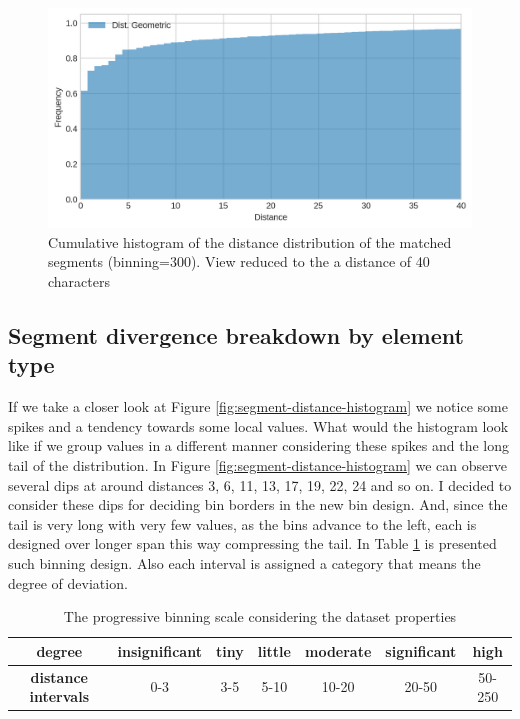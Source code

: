    \begin{figure}[!ht]
        \centering
        \includegraphics[width=.65\textwidth]{evaluation-results/figures/distance-distr-cumulative}
        \caption{Cumulative histogram of the distance distribution of the matched segments (binning=300). View reduced to the a distance of 40 characters}
        \label{fig:segment-distance-distribution}
    \end{figure}

\subsection{Segment divergence breakdown by element type}

    If we take a closer look at Figure \ref{fig:segment-distance-histogram} we notice some spikes and a tendency towards some local values. What would the histogram look like if we group values in a different manner considering these spikes and the long tail of the distribution. In Figure \ref{fig:segment-distance-histogram} we can observe several dips at around distances 3, 6, 11, 13, 17, 19, 22, 24 and so on. I decided to consider these dips for deciding bin borders in the new bin design. And, since the tail is very long with very few values, as the bins advance to the left, each is designed over longer span this way compressing the tail. In Table \ref{tab:progressive-bins} is presented such binning design. Also each interval is assigned a category that means the degree of deviation.

    \begin{table}[!ht]
        \begin{tabular}{|c|c|c|c|c|c|c|}
            \hline
            \textbf{degree}          & insignificant & tiny & little & moderate & significant & high   \\ \hline
            \textbf{distance intervals} & 0-3           & 3-5  & 5-10   & 10-20    & 20-50       & 50-250 \\ \hline
        \end{tabular}
        \caption{The progressive binning scale considering the dataset properties}
        \label{tab:progressive-bins}
    \end{table}

